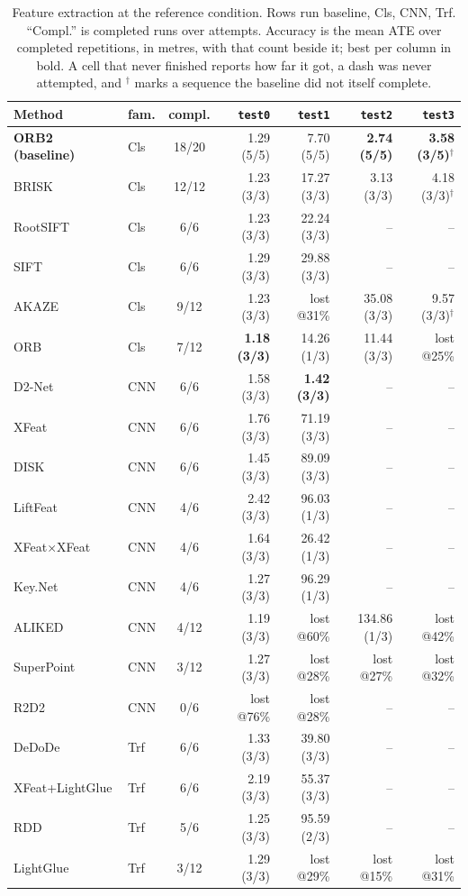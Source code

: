 \begin{table}[H]
\centering
\caption{Feature extraction at the reference condition. Rows run baseline, Cls, CNN, Trf. ``Compl.'' is completed runs over attempts. Accuracy is the mean ATE over completed repetitions, in metres, with that count beside it; best per column in bold. A cell that never finished reports how far it got, a dash was never attempted, and $^\dagger$ marks a sequence the baseline did not itself complete.}
\label{tab:sw-fe}
\footnotesize
\setlength{\tabcolsep}{4pt}
\begin{tabular}{@{}llcrrrr@{}}
\toprule
\textbf{Method} & \textbf{fam.} & \textbf{compl.} & \texttt{test0} & \texttt{test1} & \texttt{test2} & \texttt{test3} \\
\midrule
\textbf{ORB2 (baseline)} & Cls & 18/20 & 1.29 (5/5) & 7.70 (5/5) & \textbf{2.74 (5/5)} & \textbf{3.58 (3/5)$^\dagger$} \\
BRISK & Cls & 12/12 & 1.23 (3/3) & 17.27 (3/3) & 3.13 (3/3) & 4.18 (3/3)$^\dagger$ \\
RootSIFT & Cls & 6/6 & 1.23 (3/3) & 22.24 (3/3) & -- & -- \\
SIFT & Cls & 6/6 & 1.29 (3/3) & 29.88 (3/3) & -- & -- \\
AKAZE & Cls & 9/12 & 1.23 (3/3) & lost @31\% & 35.08 (3/3) & 9.57 (3/3)$^\dagger$ \\
ORB & Cls & 7/12 & \textbf{1.18 (3/3)} & 14.26 (1/3) & 11.44 (3/3) & lost @25\% \\
D2-Net & CNN & 6/6 & 1.58 (3/3) & \textbf{1.42 (3/3)} & -- & -- \\
XFeat & CNN & 6/6 & 1.76 (3/3) & 71.19 (3/3) & -- & -- \\
DISK & CNN & 6/6 & 1.45 (3/3) & 89.09 (3/3) & -- & -- \\
LiftFeat & CNN & 4/6 & 2.42 (3/3) & 96.03 (1/3) & -- & -- \\
XFeat×XFeat & CNN & 4/6 & 1.64 (3/3) & 26.42 (1/3) & -- & -- \\
Key.Net & CNN & 4/6 & 1.27 (3/3) & 96.29 (1/3) & -- & -- \\
ALIKED & CNN & 4/12 & 1.19 (3/3) & lost @60\% & 134.86 (1/3) & lost @42\% \\
SuperPoint & CNN & 3/12 & 1.27 (3/3) & lost @28\% & lost @27\% & lost @32\% \\
R2D2 & CNN & 0/6 & lost @76\% & lost @28\% & -- & -- \\
DeDoDe & Trf & 6/6 & 1.33 (3/3) & 39.80 (3/3) & -- & -- \\
XFeat+LightGlue & Trf & 6/6 & 2.19 (3/3) & 55.37 (3/3) & -- & -- \\
RDD & Trf & 5/6 & 1.25 (3/3) & 95.59 (2/3) & -- & -- \\
LightGlue & Trf & 3/12 & 1.29 (3/3) & lost @29\% & lost @15\% & lost @31\% \\
\bottomrule
\end{tabular}
\end{table}
